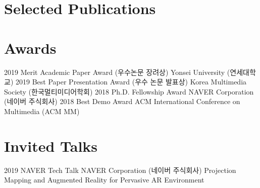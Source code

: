 \documentclass[]{friggeri-cv}
\begin{document}
\section{Selected Publications}
\begin{refsection}
  \nocite{*}
  \printbibliography[
    type=article, 
    title=\textbf{Journal articles}, 
    heading=subbibliography,
    keyword={selected}
  ]
\end{refsection}

\begin{refsection}
  \nocite{*}
  \printbibliography[
    type=inproceedings, 
    title=\textbf{Conference proceedings}, 
    heading=subbibliography,
    keyword={selected}
  ]
\end{refsection}

\section{Awards}
\begin{entrylist}
\entry
    {2019}
    {Merit Academic Paper Award (우수논문 장려상)}
    {}
    {Yonsei University (연세대학교)}
\entry
    {2019}
    {Best Paper Presentation Award (우수 논문 발표상)}
    {}
    {Korea Multimedia Society (한국멀티미디어학회)}
\entry
    {2018}
    {Ph.D. Fellowship Award}
    {}
    {NAVER Corporation (네이버 주식회사)}
\entry
    {2018}
    {Best Demo Award}
    {}
    {ACM International Conference on Multimedia (ACM MM)}
\end{entrylist}

\section{Invited Talks}
\begin{entrylist}
\entry
    {2019}
    {NAVER Tech Talk}
    {NAVER Corporation (네이버 주식회사)}
    {Projection Mapping and Augmented Reality for Pervasive AR Environment}
\end{entrylist}

\end{document}
